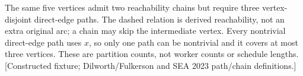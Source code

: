 \documentclass[11pt]{article}\usepackage[paperwidth=7in,paperheight=10in,textwidth=4.5in,textheight=8in,centering]{geometry}
\begin{document}
\begin{center}

\end{center}\medskip\noindent\footnotesize\raggedright The same five vertices admit two reachability chains but require three vertex-disjoint direct-edge paths. The dashed relation is derived reachability, not an extra original arc; a chain may skip the intermediate vertex. Every nontrivial direct-edge path uses $x$, so only one path can be nontrivial and it covers at most three vertices. These are partition counts, not worker counts or schedule lengths. [Constructed fixture; Dilworth/Fulkerson and SEA 2023 path/chain definitions.]
\end{document}
